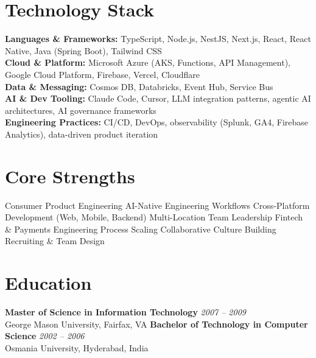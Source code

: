 \documentclass[11pt]{article}
\begin{document}
\section*{Technology Stack}
\textbf{Languages \& Frameworks:} TypeScript, Node.js, NestJS, Next.js, React, React Native, Java (Spring Boot), Tailwind CSS \\
\textbf{Cloud \& Platform:} Microsoft Azure (AKS, Functions, API Management), Google Cloud Platform, Firebase, Vercel, Cloudflare \\
\textbf{Data \& Messaging:} Cosmos DB, Databricks, Event Hub, Service Bus \\
\textbf{AI \& Dev Tooling:} Claude Code, Cursor, LLM integration patterns, agentic AI architectures, AI governance frameworks \\
\textbf{Engineering Practices:} CI/CD, DevOps, observability (Splunk, GA4, Firebase Analytics), data-driven product iteration

\section*{Core Strengths}
Consumer Product Engineering \textbullet{} AI-Native Engineering Workflows \textbullet{} Cross-Platform Development (Web, Mobile, Backend) \textbullet{} Multi-Location Team Leadership \textbullet{} Fintech \& Payments \textbullet{} Engineering Process Scaling \textbullet{} Collaborative Culture Building \textbullet{} Recruiting \& Team Design

\section*{Education}
\textbf{Master of Science in Information Technology} \hfill \textit{2007 -- 2009} \\
George Mason University, Fairfax, VA
\newline
\textbf{Bachelor of Technology in Computer Science} \hfill \textit{2002 -- 2006} \\
Osmania University, Hyderabad, India
\end{document}
